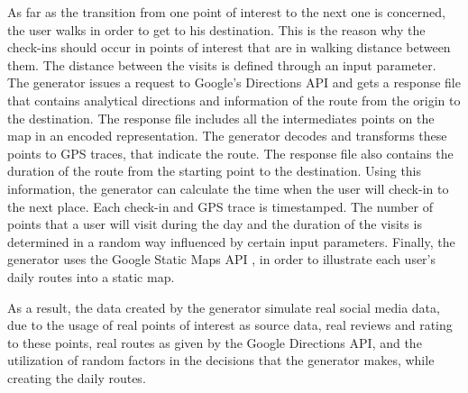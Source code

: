 As far as the transition from one point of interest to the next one is concerned, the user walks in order to get to his destination. This is the reason why 
the check-ins should occur in points of interest that are in walking distance between them. The distance between the visits is defined through an input 
parameter. The generator issues a request to Google's Directions API \cite{16} and gets a response file that contains analytical directions and information of the route 
from the origin to the destination. The response file includes all the intermediates points on the map in an encoded representation. The generator 
decodes and transforms these points to GPS traces, that indicate the route. The response file also contains the duration of the route from the starting point to 
the destination. Using this information, the generator can calculate the time when the user will check-in to the next place. Each check-in and GPS trace is 
timestamped. The number of points that a user will visit during the day and the duration of the visits is determined in a random way influenced by 
certain input parameters. Finally, the generator uses the Google Static Maps API \cite{18}, in order to illustrate each user's daily routes into a static map.

As a result, the data created by the generator simulate real social media data, due to the usage of real points of interest as source data, 
real reviews and rating to these points, real routes as given by the Google Directions API, and 
the utilization of random factors in the decisions that the generator makes, while creating the daily routes.

















